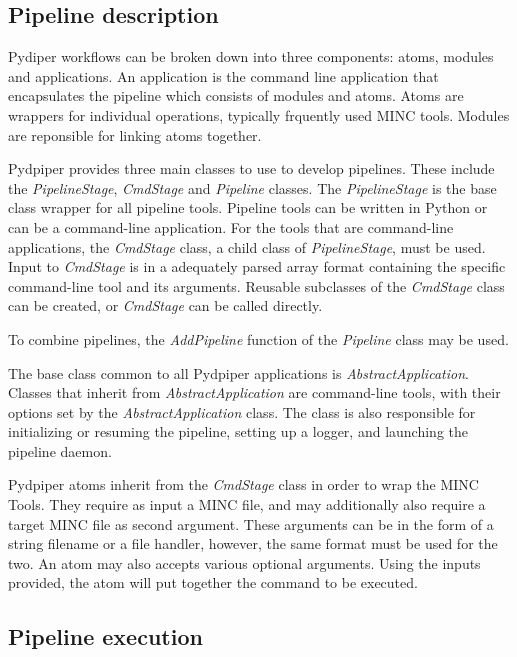 \documentclass{report}
\begin{document}
        \subsection{Pipeline description}
        Pydiper workflows can be broken down into three components: atoms,
modules and applications. An application is the command line application that
encapsulates the pipeline which consists of modules and atoms. Atoms are wrappers for individual operations,
typically frquently used MINC tools. Modules are reponsible for linking
atoms together.

        Pydpiper provides three main classes to use to develop pipelines. These
include the \textit{PipelineStage}, \textit{CmdStage} and \textit{Pipeline} classes. The
\textit{PipelineStage} is the base class wrapper for all pipeline tools.
Pipeline tools can be written in Python or can be a command-line application.
For the tools that are command-line applications, the \textit{CmdStage} class, a
child class of \textit{PipelineStage}, must be used. Input to \textit{CmdStage}
is in a adequately parsed array format containing the specific command-line
tool and its arguments. Reusable subclasses of the \textit{CmdStage} class can be
created, or \textit{CmdStage} can be called directly.

        To combine pipelines, the \textit{AddPipeline} function of the \textit{Pipeline}
        class may be used.

        The base class common to all Pydpiper applications is \textit{AbstractApplication}. 
Classes that inherit from \textit{AbstractApplication} are command-line tools, with their 
options set by the \textit{AbstractApplication} class. The class 
is also responsible for initializing or resuming the pipeline, setting up a logger, and 
launching the pipeline daemon.

        Pydpiper atoms inherit from the \textit{CmdStage} class in order to wrap the MINC Tools. 
They require as input a MINC file, and may additionally also require a target MINC file as second argument. These arguments
can be in the form of a string filename or a file handler, however, the same format must be used for the two. An atom may also accepts various optional arguments. Using the inputs provided, the atom will put together the command to be executed. 
        
        \subsection{Pipeline execution}
        
\end{document}
